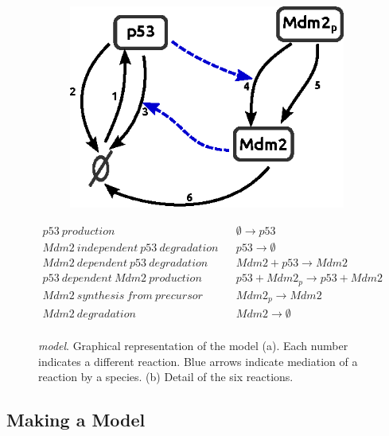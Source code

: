\begin{figure}
 \begin{subfigure}{0.3\textwidth}
\includegraphics{handmade_figures/p53.eps}
\caption{}
 \end{subfigure}
 \begin{subtable}{0.7\textwidth}
\begin{scriptsize}
  \begin{align*}
p53~production && \emptyset\rightarrow p53 \\
Mdm2~independent~p53~degradation && p53 \rightarrow \emptyset \\
Mdm2~dependent~p53~degradation && Mdm2 + p53 \rightarrow Mdm2 \\
p53~dependent~Mdm2~production && p53 + Mdm2_{p} \rightarrow p53 + Mdm2\\
Mdm2~synthesis~from~precursor && Mdm2_{p} \rightarrow Mdm2 \\
Mdm2~degradation && Mdm2 \rightarrow \emptyset \\
\end{align*}
\end{scriptsize}
\caption{}
 \end{subtable}
\caption{\emph{\pft{} model}.
Graphical representation of the model (a). Each number indicates a different reaction.
Blue arrows indicate mediation of a reaction by a species.
(b) Detail of the six reactions.
}
\label{fig:p53}
\end{figure}

\subsection{Making a Model}
\label{sec:making-a-model}


